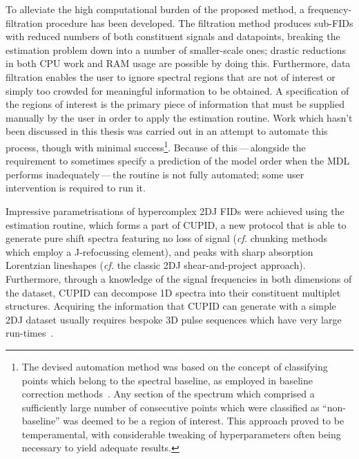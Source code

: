 To alleviate the high computational burden of the proposed method,
a frequency-filtration procedure has been developed. The filtration method
produces sub-\acp{FID} with reduced numbers of both constituent signals and datapoints,
breaking the estimation problem down into a number of smaller-scale ones;
drastic reductions in both \ac{CPU} work and \ac{RAM} usage are possible by
doing this.
Furthermore, data filtration enables the user to ignore spectral regions
that are not of interest or simply too crowded for meaningful information to be
obtained. A specification of the regions of interest is the primary
piece of information that must be supplied manually by the user in order to
apply the estimation routine.
Work which hasn't been discussed in this thesis was carried out in an attempt to
automate this process, though with minimal success\footnote{
    The devised automation method was based on the concept of classifying
    points which belong to the spectral baseline, as employed in baseline
    correction methods~\cite{Dietrich1991}. Any section of the spectrum which
    comprised a sufficiently large number of consecutive points which were
    classified as ``non-baseline'' was deemed to be a region of interest.
    This approach proved to be temperamental, with considerable tweaking
    of hyperparameters often being necessary to yield adequate results.
}. Because of this\,---\,alongside the requirement to sometimes specify a
prediction of the model order when the \ac{MDL} performs inadequately\,---\,the
routine is not fully automated; some user intervention is required to run it.

Impressive parametrisations of hypercomplex \ac{2DJ} \acp{FID} were achieved using
the estimation routine, which forms a part of \ac{CUPID}, a new protocol that
is able to generate pure shift spectra featuring no loss of signal (\textit{cf.}
chunking methods which employ a J-refocussing element), and peaks with sharp
absorption Lorentzian lineshapes
(\textit{cf.} the classic \ac{2DJ} shear-and-project approach).
Furthermore, through a knowledge of the signal frequencies in both dimensions
of the dataset, \ac{CUPID} can decompose \ac{1D} spectra into their constituent
multiplet structures. Acquiring the information that \ac{CUPID} can generate
with a simple \ac{2DJ} dataset usually requires bespoke \ac{3D} pulse sequences
which have very large run-times~\cite{Kiraly2017}.


